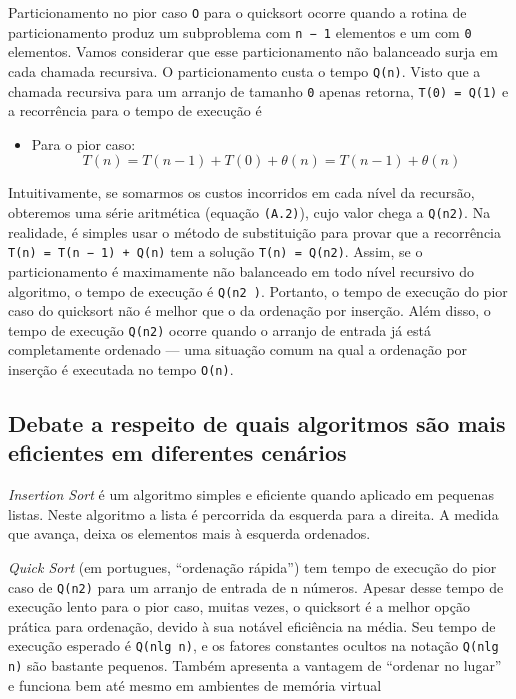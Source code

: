 \documentclass{article}
\begin{document}
Particionamento no pior caso \texttt{O} para o quicksort ocorre quando a rotina de particionamento produz um subproblema com \texttt{n − 1} elementos e um com \texttt{0} elementos. Vamos considerar que esse particionamento não balanceado surja em cada chamada recursiva. O particionamento custa o tempo \texttt{Q(n)}. Visto que a chamada recursiva para um arranjo de tamanho \texttt{0} apenas retorna, \texttt{T(0) = Q(1)} e a recorrência para o tempo de execução é
\begin{itemize}
  \item{Para o pior caso:}
    \begin{equation}
      T(n) = T(n-1) + T(0) + \theta (n) = T(n-1) + \theta (n)
    \end{equation}
\end{itemize}
Intuitivamente, se somarmos os custos incorridos em cada nível da recursão, obteremos uma série aritmética (equação \texttt{(A.2)}), cujo valor chega a \texttt{Q(n2)}. Na realidade, é simples usar o método de substituição para provar que a recorrência \texttt{T(n) = T(n − 1) + Q(n)} tem a solução \texttt{T(n) = Q(n2)}.  Assim, se o particionamento é maximamente não balanceado em todo nível recursivo do algoritmo, o tempo de execução é \texttt{Q(n2 )}. Portanto, o tempo de execução do pior caso do quicksort não é melhor que o da ordenação por inserção. Além disso, o tempo de execução \texttt{Q(n2)} ocorre quando o arranjo de entrada já está completamente ordenado — uma situação comum na qual a ordenação por inserção é executada no tempo \texttt{O(n)}.

\subsection{Debate a respeito de quais algoritmos são mais eficientes em diferentes cenários}
\textit{Insertion Sort} é um algoritmo simples e eficiente quando aplicado em pequenas listas. Neste algoritmo a lista é percorrida da esquerda para a direita. A medida que avança, deixa os elementos mais à esquerda ordenados.

\textit{Quick Sort} (em portugues, ``ordenação rápida'') tem tempo de execução do pior caso de \texttt{Q(n2)} para um arranjo de entrada de n números. Apesar desse tempo de execução lento para o pior caso, muitas vezes, o quicksort é a melhor opção prática para ordenação, devido à sua notável eficiência na média. Seu tempo de execução esperado é \texttt{Q(nlg n)}, e os fatores constantes ocultos na notação \texttt{Q(nlg n)} são bastante pequenos. Também apresenta a vantagem de ``ordenar no lugar'' e funciona bem até mesmo em ambientes de memória virtual
\end{document}
